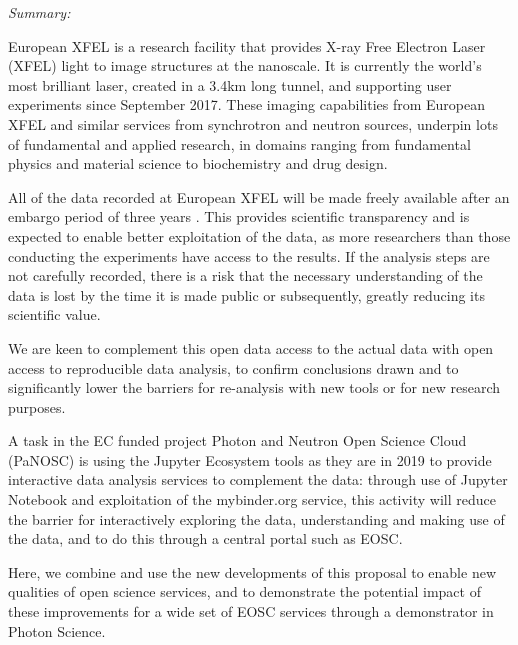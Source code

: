 \begin{task}[
  title=Reproducible X-ray crystallography workflows at European XFEL,
  id=reproducibility-xfel,
  lead=XFEL,
  PM=36,
  wphases={6-48},
  partners={}
  ]

\emph{Summary:}

  European XFEL is a research facility that provides X-ray Free
  Electron Laser (XFEL) light to image structures at the nanoscale. It
  is currently the world's most brilliant laser, created in a 3.4km
  long tunnel, and supporting user experiments since September
  2017. These imaging capabilities from European XFEL and similar
  services from synchrotron and neutron sources, underpin lots of
  fundamental and applied research, in domains ranging from fundamental
  physics and material science to biochemistry and drug design.

  All of the data recorded at European XFEL will be made freely
  available after an embargo period of three years
  \cite{EuXFEL-datapolicy-2017}. This provides scientific transparency
  and is expected to enable better exploitation of the data, as more
  researchers than those conducting the experiments have access to the
  results. If the analysis steps are not carefully recorded, there is a risk
  that the necessary understanding of the data is lost by the time it
  is made public or subsequently, greatly reducing its scientific
  value.

  We are keen to complement this open data access to the actual data
  with open access to reproducible data analysis, to confirm
  conclusions drawn and to significantly lower the barriers for
  re-analysis with new tools or for new research purposes.

  A task in the EC funded project Photon and Neutron Open Science
  Cloud (PaNOSC) is using the Jupyter Ecosystem tools as they are in
  2019 to provide interactive data analysis services to complement the
  data: through use of Jupyter Notebook and exploitation of the
  mybinder.org service, this activity will reduce the barrier for
  interactively exploring the data, understanding and making use of
  the data, and to do this through a central portal such as EOSC.

  Here, we combine and use the new developments of this
  proposal to enable new qualities of open science services, and to
  demonstrate the potential impact of these improvements for a wide
  set of EOSC services through a demonstrator in Photon Science.


\end{task}
